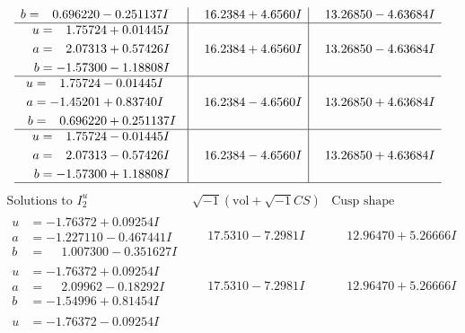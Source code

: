 \documentclass[1p]{elsarticle_modified}
\theoremstyle{definition}
\newcommand{\I}{\sqrt{-1}}
\begin{document}
$$\begin{array}{c|c|c}
\begin{aligned}
b &= \phantom{-}0.696220 - 0.251137 I\end{aligned}
 & \phantom{-}16.2384 + 4.6560 I & \phantom{-}13.26850 - 4.63684 I \\ \hline\begin{aligned}
u &= \phantom{-}1.75724 + 0.01445 I \\
a &= \phantom{-}2.07313 + 0.57426 I \\
b &= -1.57300 - 1.18808 I\end{aligned}
 & \phantom{-}16.2384 + 4.6560 I & \phantom{-}13.26850 - 4.63684 I \\ \hline\begin{aligned}
u &= \phantom{-}1.75724 - 0.01445 I \\
a &= -1.45201 + 0.83740 I \\
b &= \phantom{-}0.696220 + 0.251137 I\end{aligned}
 & \phantom{-}16.2384 - 4.6560 I & \phantom{-}13.26850 + 4.63684 I \\ \hline\begin{aligned}
u &= \phantom{-}1.75724 - 0.01445 I \\
a &= \phantom{-}2.07313 - 0.57426 I \\
b &= -1.57300 + 1.18808 I\end{aligned}
 & \phantom{-}16.2384 - 4.6560 I & \phantom{-}13.26850 + 4.63684 I\\
 \hline 
 \end{array}$$\newpage$$\begin{array}{c|c|c}  
\text{Solutions to }I^u_{2}& \I (\text{vol} + \sqrt{-1}CS) & \text{Cusp shape}\\
 \hline 
\begin{aligned}
u &= -1.76372 + 0.09254 I \\
a &= -1.227110 - 0.467441 I \\
b &= \phantom{-}1.007300 - 0.351627 I\end{aligned}
 & \phantom{-}17.5310 - 7.2981 I & \phantom{-}12.96470 + 5.26666 I \\ \hline\begin{aligned}
u &= -1.76372 + 0.09254 I \\
a &= \phantom{-}2.09962 - 0.18292 I \\
b &= -1.54996 + 0.81454 I\end{aligned}
 & \phantom{-}17.5310 - 7.2981 I & \phantom{-}12.96470 + 5.26666 I \\ \hline\begin{aligned}
u &= -1.76372 - 0.09254 I \\

\end{aligned}
\end{array}$$
\end{document}
